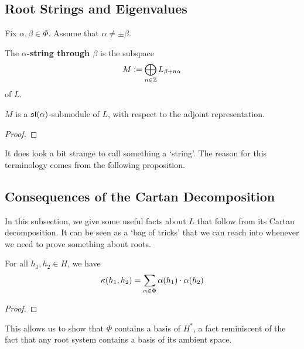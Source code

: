\subsection{Root Strings and Eigenvalues}

Fix $\alpha, \beta \in \Phi$. Assume that $\alpha \neq \pm \beta$.

\begin{boxdefinition}[Strings]
    The \textbf{$\alpha$-string through $\beta$} is the subspace
    \begin{align*}
        M := \bigoplus_{n \in \Z} L_{\beta + n\alpha}
    \end{align*}
    of $L$.
\end{boxdefinition}

\begin{boxlemma}
    $M$ is a $\sl{\alpha}$-submodule of $L$, with respect to the adjoint representation.
\end{boxlemma}
\begin{proof}
    \sorry %
\end{proof}

It does look a bit strange to call something a `string'. The reason for this terminology comes from the following proposition.

\begin{boxproposition}
    \sorry
\end{boxproposition}

\subsection{Consequences of the Cartan Decomposition}

In this subsection, we give some useful facts about $L$ that follow from its Cartan decomposition. It can be seen as a `bag of tricks' that we can reach into whenever we need to prove something about roots.

\begin{boxlemma}
    For all $h_1, h_2 \in H$, we have
    \begin{align*}
        \kof{h_1, h_2} = \sum_{\alpha \in \Phi} \alpha\!\parenth{h_1} \cdot \alpha\!\parenth{h_2}
    \end{align*}
\end{boxlemma}
\begin{proof}
    \sorry
\end{proof}

This allows us to show that $\Phi$ contains a basis of $H^*$, a fact reminiscent of the fact that any root system contains a basis of its ambient space.

